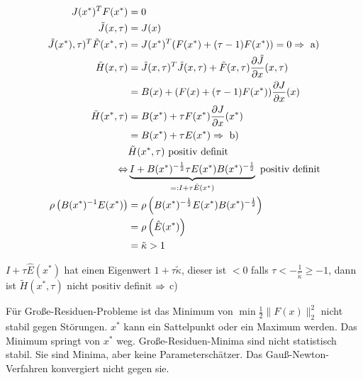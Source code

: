 \begin{align*}
J(x^*)^T F(x^*) &= 0 \\
\tilde J(x,\tau) &= J(x) \\
\tilde J(x^*), \tau)^T \tilde F(x^*, \tau) &= J(x^*)^T ( F(x^*) + (\tau-1) F(x^*)) = 0 \Rightarrow \text{ a)} \\
\tilde H(x,\tau) &= \tilde J(x,\tau)^T \tilde J(x,\tau)  + \tilde F(x,\tau) \frac{\partial \tilde J}{\partial x} (x,\tau) \\
&= B(x) + (F(x) + (\tau-1) F(x^*)) \frac{\partial J}{\partial x}(x) \\
\tilde H(x^*,\tau) &= B(x^*) + \tau F(x^*) \frac{\partial J}{\partial x}(x^*) \\
&= B(x^*) + \tau E(x^*) \Rightarrow \text{ b)} \\
& \tilde H(x^*, \tau) \text{ positiv definit} \\
\Leftrightarrow & \underbrace{I + B(x^*)^{-\frac 12} \tau E(x^*) B(x^*)^{-\frac 12}}_{=: I + \tau \hat E(x^*)} \text{ positiv definit} \\
\rho\left( B(x^*)^{-1} E(x^*)\right) &= \rho\left( B(x^*)^{-\frac 12} E(x^*) B(x^*)^{-\frac 12} \right) \\
&= \rho \left( \hat E(x^*) \right) \\
&= \tilde \kappa > 1 \\
\end{align*}

$I+\tau \hat E(x^*)$ hat einen Eigenwert $1+\tau \tilde \kappa$, dieser ist $<0$ falls $\tau < - \frac{1}{\tilde \kappa} \geq -1$, dann ist $\tilde H(x^*,\tau)$ nicht positiv definit $\Rightarrow$ c)


Für Große-Residuen-Probleme ist das Minimum von $\min \frac 12 \|F(x)\|_2^2$ nicht stabil gegen Störungen. $x^*$ kann ein Sattelpunkt oder ein Maximum werden. Das Minimum springt von $x^*$ weg. Große-Residuen-Minima sind nicht statistisch stabil. Sie sind Minima, aber keine Parameterschätzer. Das Gauß-Newton-Verfahren konvergiert nicht gegen sie.

























































